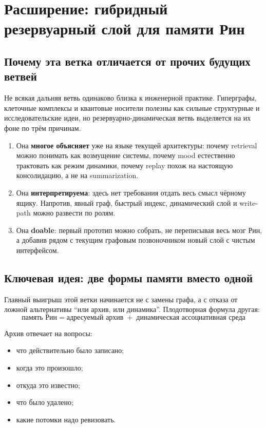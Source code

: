 ﻿\chapter{Расширение: гибридный резервуарный слой для памяти Рин}
\label{ch:reservoirbranch}

\section{Почему эта ветка отличается от прочих будущих ветвей}

Не всякая дальняя ветвь одинаково близка к инженерной практике. Гиперграфы, клеточные
комплексы и квантовые носители полезны как сильные структурные и исследовательские идеи,
но резервуарно-динамическая ветвь выделяется на их фоне по трём причинам.

\begin{enumerate}
\item Она \textbf{многое объясняет} уже на языке текущей архитектуры: почему retrieval
можно понимать как возмущение системы, почему mood естественно трактовать как режим
динамики, почему replay похож на настоящую консолидацию, а не на summarization.
\item Она \textbf{интерпретируема}: здесь нет требования отдать весь смысл чёрному ящику.
Напротив, явный граф, быстрый индекс, динамический слой и write-path можно развести по ролям.
\item Она \textbf{doable}: первый прототип можно собрать, не переписывая весь мозг Рин,
а добавив рядом с текущим графовым позвоночником новый слой с чистым интерфейсом.
\end{enumerate}

\section{Ключевая идея: две формы памяти вместо одной}

Главный выигрыш этой ветки начинается не с замены графа, а с отказа от ложной альтернативы
``или архив, или динамика''. Плодотворная формула другая:
\[
\boxed{
\text{память Рин}=
\text{адресуемый архив}
\;+\;
\text{динамическая ассоциативная среда}
}
\]

Архив отвечает на вопросы:
\begin{itemize}
\item что действительно было записано;
\item когда это произошло;
\item откуда это известно;
\item что было удалено;
\item какие потомки надо ревизовать.
\end{itemize}

